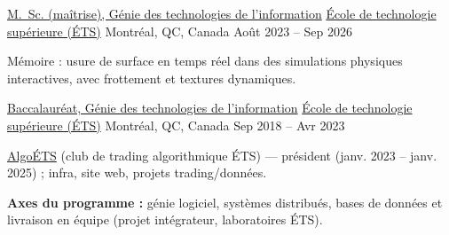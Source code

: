 \begin{cventries}

\cventry
{\href{https://www.etsmtl.ca/programmes-formations/maitrise-genie-technologies-information}{M.~Sc. (maîtrise), Génie des technologies de l'information}} %
{\href{https://www.etsmtl.ca/}{École de technologie supérieure (ÉTS)}} %
{Montréal, QC, Canada} %
{Août 2023 -- Sep 2026} %
{
\begin{cvitems} %
\item {Mémoire : usure de surface en temps réel dans des simulations physiques interactives, avec frottement et textures dynamiques.}
\end{cvitems}
}

\cventry
{\href{https://www.etsmtl.ca/programmes-formations/baccalaureat-genie-des-ti}{Baccalauréat, Génie des technologies de l'information}} %
{\href{https://www.etsmtl.ca/}{École de technologie supérieure (ÉTS)}} %
{Montréal, QC, Canada} %
{Sep 2018 -- Avr 2023} %
{
\begin{cvitems} %
\item {\href{https://github.com/AlgoETS}{AlgoÉTS} (club de trading algorithmique ÉTS) — président (janv. 2023 -- janv. 2025) ; infra, site web, projets trading/données.}
\item {\textbf{Axes du programme :} génie logiciel, systèmes distribués, bases de données et livraison en équipe (projet intégrateur, laboratoires ÉTS).}
\end{cvitems}
}

\end{cventries}

